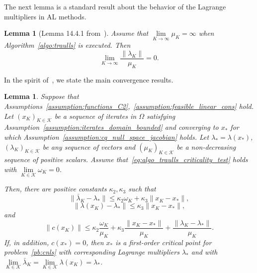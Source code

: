 \documentclass{article}
\numberwithin{equation}{section}
\newcommand{\calK}{{\mathcal{K}}}
\theoremstyle{plain}
\newtheorem{lemma}[theorem]{Lemma}
\begin{document}
	The next lemma is a standard result about the behavior of the Lagrange multipliers in AL methods.
	\begin{lemma}[Lemma 14.4.1 from~\cite{conn-etal:2000}]\label{lemma:behavior_multipliers}
		Assume that $\lim\limits_{K\to \infty} \mu_K = \infty$ when Algorithm~\ref{algo:traulls} is executed. Then 
		\begin{equation*}
			\lim\limits_{K\to \infty} \frac{\|\lambda_K\|}{\mu_K} = 0.
		\end{equation*}
	\end{lemma}
	
	In the spirit of~\cite[Lemma 4.3]{conn-etal:1996b}, we state the main convergence results.
	\begin{lemma}\label{lemma:key_lemma}
		Suppose that Assumptions~\ref{assumption:functions_C2},~\ref{assumption:feasible_linear_cons} hold. Let $\left(x_K\right)_{K\in \calK}$ be a sequence of iterates in $\Omega$ satisfying Assumption~\ref{assumption:iterates_domain_bounded} and converging to $x_*$ for which Assumption~\ref{assumption:cq_null_space_jacobian} holds. Let $\lambda_* = \lambda(x_*)$, $(\lambda_K)_{K \in \calK}$ be any sequence of vectors and $(\mu_K)_{K \in \calK}$ be a non-decreasing sequence of positive scalars. Assume that~\eqref{eq:algo_traulls_criticality_test} holds with $\lim\limits_{K \in \calK}\omega_K = 0$.
		
		Then, there are positive constants $\kappa_2, \kappa_3$ such that
		\begin{equation}\label{eq:bound_1st_order_mult}
			\|\bar{\lambda}_K - \lambda_* \| \le \kappa_2 \omega_K + \kappa_3 \|x_K-x_*\|,
		\end{equation}
		\begin{equation}\label{eq:bound_ls_mult}
			\|\lambda(x_K) - \lambda_* \| \le \kappa_3 \|x_K-x_*\|,
		\end{equation}
		and
		\begin{equation}\label{eq:bound_norm_cons}
			\|c(x_K)\| \le \kappa_2 \frac{\omega_K}{\mu_K} + \kappa_3 \frac{\|x_K-x_*\|}{\mu_K} + \frac{\|\lambda_K - \lambda_* \|}{\mu_K}.
		\end{equation}
		If, in addition, $c(x_*) = 0$, then $x_*$ is a first-order critical point for problem~\eqref{pb:cnls} with corresponding Lagrange multipliers $\lambda_*$ and with $\lim\limits_{K \in \calK} \bar{\lambda}_K = \lim\limits_{K \in \calK} \lambda(x_K) = \lambda_*$.
	\end{lemma}
	
\end{document}
